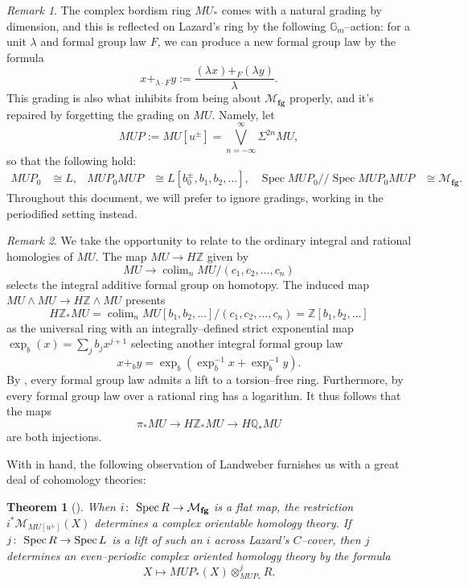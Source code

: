 \documentclass{amsart}
\newcommand{\Z}{\mathbb Z}
\newcommand{\Q}{\mathbb{Q}}
\newcommand{\<}{\langle}
\renewcommand{\>}{\rangle}
\newcommand{\sm}{\wedge}
\newcommand{\Susp}{\Sigma}
\newcommand{\mmod}{/\!\!/}
\newcommand{\co}{\colon\thinspace}
\newcommand{\moduli}[1]{\mathcal{M}_{\mathbf{#1}}}
\newcommand{\sheaf}[1]{\mathcal{#1}}
\DeclareMathOperator{\Spec}{Spec}
\DeclareMathOperator{\colim}{colim}
\theoremstyle{plain}
\newtheorem*{theorem}{Theorem}
\theoremstyle{definition}
\theoremstyle{remark}
\newtheorem*{remark}{Remark}
\begin{document}
\begin{remark}\label{WarningAboutGradings}
The complex bordism ring $MU_*$ comes with a natural grading by dimension, and this is reflected on Lazard's ring by the following $\mathbb G_m$--action: for a unit $\lambda$ and formal group law $F$, we can produce a new formal group law by the formula \[x +_{\lambda \cdot F} y := \frac{(\lambda x) +_F (\lambda y)}{\lambda}.\]  This grading is also what inhibits  from being about $\moduli{fg}$ properly, and it's repaired by forgetting the grading on $MU$.  Namely, let \[MUP := MU[u^\pm] = \bigvee_{n=-\infty}^\infty \Susp^{2n} MU,\] so that the following hold:
\begin{align*}
MUP_0 & \cong L, & MUP_0 MUP & \cong L[b_0^\pm, b_1, b_2, \ldots], & \Spec MUP_0 \mmod \Spec MUP_0 MUP & \cong \moduli{fg}.
\end{align*}
Throughout this document, we will prefer to ignore gradings, working in the periodified setting instead.
\end{remark}

\begin{remark}
We take the opportunity to relate  to the ordinary integral and rational homologies of $MU$.  The map $MU \to H\Z$ given by \[MU \to \colim_n MU / (c_1, c_2, \ldots, c_n)\] selects the integral additive formal group on homotopy.  The induced map $MU \sm MU \to H\Z \sm MU$ presents \[H\Z_* MU = \colim_n MU[b_1, b_2, \ldots] / (c_1, c_2, \ldots, c_n) = \Z[b_1, b_2, \ldots]\] as the universal ring with an integrally--defined strict exponential map $\exp_b(x) = \sum_j b_j x^{j+1}$ selecting another integral formal group law \[x +_b y = \exp_b( \exp^{-1}_b x + \exp^{-1}_b y).\]  By , every formal group law admits a lift to a torsion--free ring.  Furthermore, by  every formal group law over a rational ring has a logarithm.  It thus follows that the maps \[\pi_* MU \to H\Z_* MU \to H\Q_* MU\] are both injections.
\end{remark}

With  in hand, the following observation of Landweber furnishes us with a great deal of cohomology theories:
\begin{theorem}[{\cite{LandweberEFT}}]\label{LandweberExactness}
When $i \co \Spec R \to \moduli{fg}$ is a flat map, the restriction $i^* \sheaf{M}_{MU[u^\pm]}(X)$ determines a complex orientable homology theory.  If $j \co \Spec R \to \Spec L$ is a lift of such an $i$ across Lazard's $C$--cover, then $j$ determines an even--periodic complex oriented homology theory by the formula \[X \mapsto MUP_*(X) \otimes_{MUP_*}^j R.\]
\end{theorem}
\end{document}
